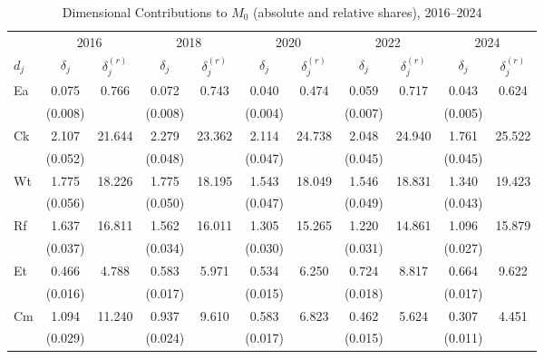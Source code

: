 \documentclass[11pt, a4paper]{article}
\begin{document}
\begin{table}[htb]
\centering
\caption{Dimensional Contributions to $M_0$ (absolute and relative shares), 2016--2024}
\small
\begin{tabularx}{\textwidth}{X cccccccccc}
\toprule
\toprule
 & \multicolumn{2}{c}{2016} & \multicolumn{2}{c}{2018} & \multicolumn{2}{c}{2020} & \multicolumn{2}{c}{2022} & \multicolumn{2}{c}{2024} \\
\cmidrule(lr){2-3} \cmidrule(lr){4-5} \cmidrule(lr){6-7} \cmidrule(lr){8-9} \cmidrule(lr){10-11}
$d_j$ & $\delta_j$ & $\delta_j^{(r)}$ & $\delta_j$ & $\delta_j^{(r)}$ & $\delta_j$ & $\delta_j^{(r)}$ & $\delta_j$ & $\delta_j^{(r)}$ & $\delta_j$ & $\delta_j^{(r)}$ \\
\midrule
Ea   & 0.075 & 0.766 & 0.072 & 0.743 & 0.040 & 0.474 & 0.059 & 0.717 & 0.043 & 0.624 \\
     & {\footnotesize (0.008)} & & {\footnotesize (0.008)} & & {\footnotesize (0.004)} & & {\footnotesize (0.007)} & & {\footnotesize (0.005)} & \\[2pt]
Ck   & 2.107 & 21.644 & 2.279 & 23.362 & 2.114 & 24.738 & 2.048 & 24.940 & 1.761 & 25.522 \\
     & {\footnotesize (0.052)} & & {\footnotesize (0.048)} & & {\footnotesize (0.047)} & & {\footnotesize (0.045)} & & {\footnotesize (0.045)} & \\[2pt]
Wt   & 1.775 & 18.226 & 1.775 & 18.195 & 1.543 & 18.049 & 1.546 & 18.831 & 1.340 & 19.423 \\
     & {\footnotesize (0.056)} & & {\footnotesize (0.050)} & & {\footnotesize (0.047)} & & {\footnotesize (0.049)} & & {\footnotesize (0.043)} & \\[2pt]
Rf   & 1.637 & 16.811 & 1.562 & 16.011 & 1.305 & 15.265 & 1.220 & 14.861 & 1.096 & 15.879 \\
     & {\footnotesize (0.037)} & & {\footnotesize (0.034)} & & {\footnotesize (0.030)} & & {\footnotesize (0.031)} & & {\footnotesize (0.027)} & \\[2pt]
Et   & 0.466 & 4.788 & 0.583 & 5.971 & 0.534 & 6.250 & 0.724 & 8.817 & 0.664 & 9.622 \\
     & {\footnotesize (0.016)} & & {\footnotesize (0.017)} & & {\footnotesize (0.015)} & & {\footnotesize (0.018)} & & {\footnotesize (0.017)} & \\[2pt]
Cm   & 1.094 & 11.240 & 0.937 & 9.610 & 0.583 & 6.823 & 0.462 & 5.624 & 0.307 & 4.451 \\
     & {\footnotesize (0.029)} & & {\footnotesize (0.024)} & & {\footnotesize (0.017)} & & {\footnotesize (0.015)} & & {\footnotesize (0.011)} & \\[2pt]

\end{tabularx}
\end{table}
\end{document}
